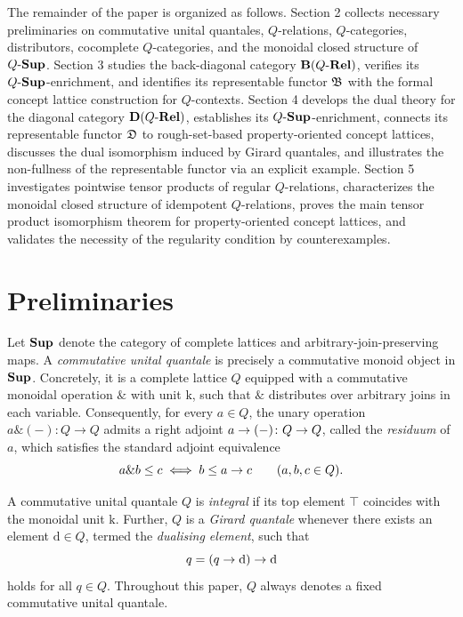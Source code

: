 \documentclass{tac}
\begin{document}
The remainder of the paper is organized as follows. Section 2 collects necessary preliminaries on commutative unital quantales, \(Q\)-relations, \(Q\)-categories, distributors, cocomplete \(Q\)-categories, and the monoidal closed structure of \({Q\text{-}\mathbf{Sup}}\). Section 3 studies the back-diagonal category \({\mathbf{B}(Q\text{-}\mathbf{Rel})}\), verifies its \({Q\text{-}\mathbf{Sup}}\)-enrichment, and identifies its representable functor $\mathfrak{B}$ with the formal concept lattice construction for \(Q\)-contexts. Section 4 develops the dual theory for the diagonal category \({\mathbf{D}(Q\text{-}\mathbf{Rel})}\), establishes its \({Q\text{-}\mathbf{Sup}}\)-enrichment, connects its representable functor $\mathfrak{D}$ to rough-set-based property-oriented concept lattices, discusses the dual isomorphism induced by Girard quantales, and illustrates the non-fullness of the representable functor via an explicit example. Section 5 investigates pointwise tensor products of regular \(Q\)-relations, characterizes the monoidal closed structure of idempotent \(Q\)-relations, proves the main tensor product isomorphism theorem for property-oriented concept lattices, and validates the necessity of the regularity condition by counterexamples.


\section{Preliminaries} \label{sec:prelim}

Let \(\mathbf{Sup}\) denote the category of complete lattices and arbitrary-join-preserving maps. A \emph{commutative unital quantale} \cite{Rosenthal1990} is precisely a commutative monoid object in \(\mathbf{Sup}\). Concretely, it is a complete lattice \(Q\) equipped with a commutative monoidal operation \(\&\) with unit \(\mathrm{k}\), such that \(\&\) distributes over arbitrary joins in each variable. Consequently, for every \(a\in Q\), the unary operation \(a\&(-)\colon Q\to Q\) admits a right adjoint \(a\rightarrow(-)\colon Q\to Q\), called the \emph{residuum} of \(a\), which satisfies the standard adjoint equivalence
\begin{equation*}
a\& b\leq c \iff b\leq a\rightarrow c \qquad (a,b,c\in Q).
\end{equation*}

A commutative unital quantale \(Q\) is \emph{integral} if its top element \(\top\) coincides with the monoidal unit \(\mathrm{k}\). Further, \(Q\) is a \emph{Girard quantale} whenever there exists an element \(\mathrm{d}\in Q\), termed the \emph{dualising element}, such that
\begin{equation*}
q=(q\rightarrow \mathrm{d})\rightarrow \mathrm{d}
\end{equation*}
holds for all \(q\in Q\). Throughout this paper, \(Q\) always denotes a fixed commutative unital quantale.
\end{document}
